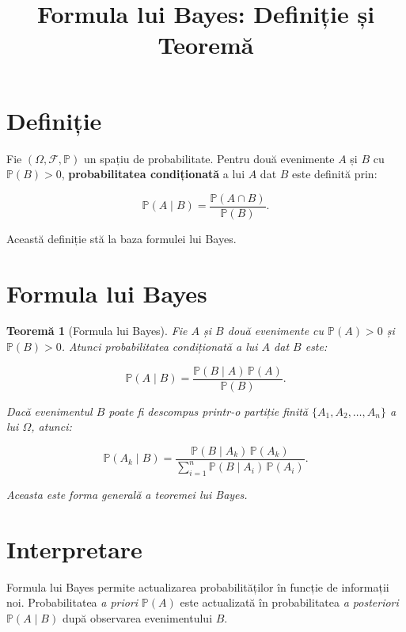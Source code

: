 \documentclass[12pt]{article}
\title{Formula lui Bayes: Definiție și Teoremă}
\author{}
\date{}
\theoremstyle{plain}
\newtheorem{theorem}{Teoremă}
\begin{document}
\maketitle

\section{Definiție}

Fie $(\Omega, \mathcal{F}, \mathbb{P})$ un spațiu de probabilitate.
Pentru două evenimente $A$ și $B$ cu $\mathbb{P}(B) > 0$, 
\textbf{probabilitatea condiționată} a lui $A$ dat $B$ este definită prin:



\[
\mathbb{P}(A \mid B)
= \frac{\mathbb{P}(A \cap B)}{\mathbb{P}(B)}.
\]



Această definiție stă la baza formulei lui Bayes.

\section{Formula lui Bayes}

\begin{theorem}[Formula lui Bayes]
Fie $A$ și $B$ două evenimente cu $\mathbb{P}(A) > 0$ și $\mathbb{P}(B) > 0$.
Atunci probabilitatea condiționată a lui $A$ dat $B$ este:



\[
\mathbb{P}(A \mid B)
= \frac{\mathbb{P}(B \mid A)\,\mathbb{P}(A)}
       {\mathbb{P}(B)}.
\]



Dacă evenimentul $B$ poate fi descompus printr-o partiție finită
$\{A_1, A_2, \dots, A_n\}$ a lui $\Omega$, atunci:



\[
\mathbb{P}(A_k \mid B)
= \frac{\mathbb{P}(B \mid A_k)\,\mathbb{P}(A_k)}
       {\sum_{i=1}^n \mathbb{P}(B \mid A_i)\,\mathbb{P}(A_i)}.
\]



Aceasta este forma generală a teoremei lui Bayes.
\end{theorem}

\section{Interpretare}

Formula lui Bayes permite actualizarea probabilităților în funcție de informații noi.
Probabilitatea \emph{a priori} $\mathbb{P}(A)$ este actualizată în probabilitatea
\emph{a posteriori} $\mathbb{P}(A \mid B)$ după observarea evenimentului $B$.
\end{document}
